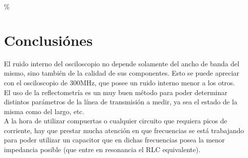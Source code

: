 \documentclass[a4paper,10pt]{article}
\begin{document}
	\% 
	\newpage 
	\section{Conclusiónes}
	\indent El ruido interno del osciloscopio no depende solamente del ancho de 
	banda del mismo, sino también de la calidad de sus componentes. Esto se 
	puede apreciar con el osciloscopio de 300MHz, que posee un ruido interno 
	menor a los otros. \\
	\indent El uso de la reflectometría es un muy buen método para poder 
	determinar distintos parámetros de la línea de transmisión a medir, ya sea 
	el estado de la misma como del largo, etc. \\
	\indent A la hora de utilizar compuertas o cualquier circuito que requiera 
	picos de corriente, hay que prestar mucha atención en que frecuencias se 
	está trabajando para poder utilizar un capacitor que en dichas frecuencias 
	posea la menor impedancia posible (que entre en resonancia el RLC 
	equivalente). \\
\end{document}
